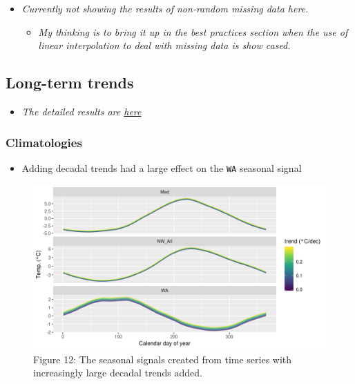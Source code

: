 \documentclass[]{article}
\providecommand{\tightlist}{%
  \setlength{\itemsep}{0pt}\setlength{\parskip}{0pt}}
\begin{document}
\begin{itemize}
\tightlist
\item
  \emph{Currently not showing the results of non-random missing data
  here.}

  \begin{itemize}
  \tightlist
  \item
    \emph{My thinking is to bring it up in the best practices section
    when the use of linear interpolation to deal with missing data is
    show cased.}
  \end{itemize}
\end{itemize}

\subsection{Long-term trends}\label{long-term-trends}

\begin{itemize}
\tightlist
\item
  \emph{The detailed results are
  \href{https://robwschlegel.github.io/MHWdetection/articles/trend.html}{here}}
\end{itemize}

\subsubsection{Climatologies}\label{climatologies-2}

\begin{itemize}
\tightlist
\item
  Adding decadal trends had a large effect on the \texttt{WA} seasonal
  signal
\end{itemize}

\begin{figure}
\centering
\includegraphics{../docs/articles/trend_files/figure-html/clim-trend-seas-1.png}
\caption{Figure 12: The seasonal signals created from time series with
increasingly large decadal trends added.}
\end{figure}
\end{document}
